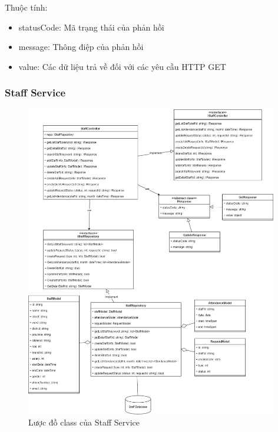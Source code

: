 Thuộc tính:
\begin{itemize}
	\item statusCode: Mã trạng thái của phản hồi
	\item message: Thông điệp của phản hồi
	\item value: Các dữ liệu trả về đối với các yêu cầu HTTP GET
\end{itemize}



\subsubsection{Staff Service}
\begin{figure}[!htp]
	\centering
	\includegraphics[width=11cm]{img/Architecture/service/StaffService.png}
	\newline
	\caption{Lược đồ class của Staff Service}
\end{figure}

